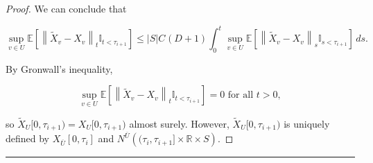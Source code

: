 \documentclass[12pt]{article}
\newcommand{\mb}{\mathbb}
\newcommand{\ov}{\overline}
\newcommand{\te}{\text}
\newcommand{\lin}{\rule{\linewidth}{0.4 pt}}
\newcommand{\ex}[1]{\mb{E}\left[#1\right]}			%
\renewcommand{\v}{v}							%
\renewcommand{\U}{U}							%
\renewcommand{\S}{S}							%
\renewcommand{\t}{t}							%
\renewcommand{\tt}{s}							%
\newcommand{\X}{X}								%
\newcommand{\vind}[1]{^{#1}}					%
\newcommand{\cind}[1]{_{#1}}					%
\newcommand{\cl}{\ov}							%
\newcommand{\tip}[1]{#1}						%
\newcommand{\const}{C}							%
\newcommand{\degr}{D}							%
\newcommand{\poiss}{N}							%
\newcommand{\alt}[1]{\widetilde{#1}}			%
\newcommand{\indx}[1]{_{#1}}					%
\newcommand{\rt}{\tau}							%
\begin{document}
\begin{proof}
We can conclude that

\[\sup_{\v\in \U}\ex{\left\|\alt{\X}\cind{\v}\tip{} - \X\cind{\v}\tip{}\right\|_{\t}\mb{I}_{\t <\rt\indx{i+1}}} \leq |\S|\const\indx{}(\degr+1)\int_0^\t\sup_{v\in\U}\ex{\left\|\alt{\X}\cind{\v}\tip{} - \X\cind{\v}\tip{}\right\|_\tt\mb{I}_{\tt < \rt\indx{i+1}}}\,d\tt.\]

By Gronwall's inequality,

\[\sup_{v\in \U}\ex{\left\|\alt{\X}\cind{\v}\tip{} - \X\cind{\v}\tip{}\right\|_\t\mb{I}_{\t < \rt\indx{i+1}}} = 0 \te{ for all } \t > 0,\]

so \(\alt{\X}\cind{\U}\tip{[0,\rt\indx{i+1})} = \X\cind{\U}\tip{[0,\rt\indx{i+1})}\) almost surely. However, \(\alt{\X}\cind{\U}\tip{[0,\rt\indx{i+1})}\) is uniquely defined by \(\X\cind{\cl{\U}}\tip{[0,\rt\indx{i}]}\) and \(\poiss\vind{\cl{\U}}\left((\rt\indx{i},\rt\indx{i+1}]\times \mb{R}\times \S\right)\).
\end{proof}

\lin
\end{document}
